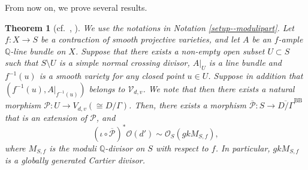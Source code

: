 \documentclass[12pt,twoside]{amsart}
\newtheorem{thm}{Theorem}[section]
\theoremstyle{definition}
\begin{document}
From now on, we prove several results.

\begin{thm}[cf.~{\cite[Theorem 1.2]{fujino--canonical-certain}, \cite[Theorem 1.1]{kim-can-bundle-formula}}]\label{thm--fujino-kim}
We use the notations in Notation \ref{setup--modulipart}.
Let $f\colon X\to S$ be a contraction of smooth projective varieties, and let $A$ be an $f$-ample $\mathbb{Q}$-line bundle on $X$.
Suppose that there exists a non-empty open subset $U\subset S$ such that $S\setminus U$ is a simple normal crossing divisor, $A|_{U}$ is a line bundle and $f^{-1}(u)$ is a smooth variety for any closed point $u\in U$.
Suppose in addition that $(f^{-1}(u),A|_{f^{-1}(u)})$ belongs to $\mathcal{V}_{d,v}$.
We note that then there exists a natural morphism $\mathcal{P}\colon U\to V_{d,v}(\cong D/\Gamma)$.
Then, there exists a morphism $\overline{\mathcal{P}}\colon S\to \overline{ D/\Gamma}^{\mathrm{BB}}$ that is an extension of $\mathcal{P}$, and 
\begin{equation*}
(\iota\circ\overline{\mathcal{P}})^*\mathcal{O}(d')\sim \mathcal{O}_{S}(gkM_{S,f}),
\end{equation*}
where $M_{S,f}$ is the moduli $\mathbb{Q}$-divisor on $S$ with respect to $f$.
In particular, $gkM_{S,f}$ is a globally generated Cartier divisor.
\end{thm}
\end{document}
